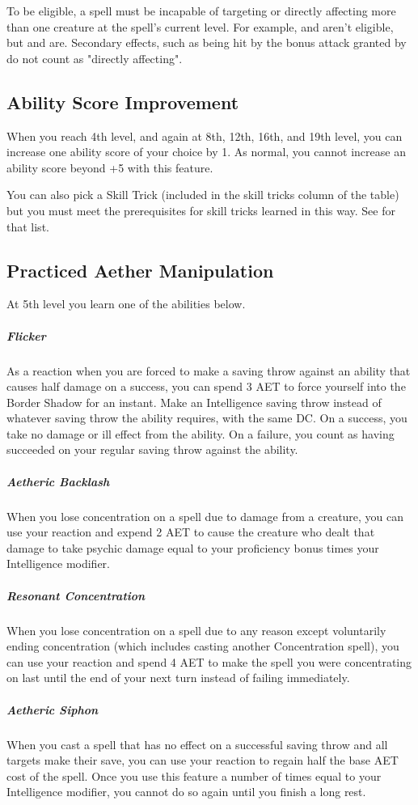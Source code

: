 To be eligible, a spell must be incapable of targeting or directly affecting more than one creature at the spell's current level. For example,  and  aren't eligible, but  and  are. Secondary effects, such as being hit by the bonus attack granted by  do not count as "directly affecting".

\subsection{Ability Score Improvement}

When you reach 4th level, and again at 8th, 12th, 16th, and 19th level, you can increase one ability score of your choice by 1. As normal, you cannot increase an ability score beyond +5 with this feature.

You can also pick a Skill Trick (included in the skill tricks column of the  table) but you must meet the prerequisites for skill tricks learned in this way. See  for that list.

\subsection{Practiced Aether Manipulation}
At 5th level you learn one of the abilities below.
\subparagraph*{Flicker} As a reaction when you are forced to make a saving throw against an ability that causes half damage on a success, you can spend 3 AET to force yourself into the Border Shadow for an instant. Make an Intelligence saving throw instead of whatever saving throw the ability requires, with the same DC. On a success, you take no damage or ill effect from the ability. On a failure, you count as having succeeded on your regular saving throw against the ability.
\subparagraph*{Aetheric Backlash} When you lose concentration on a spell due to damage from a creature, you can use your reaction and expend 2 AET to cause the creature who dealt that damage to take psychic damage equal to your proficiency bonus times your Intelligence modifier.
\subparagraph*{Resonant Concentration} When you lose concentration on a spell due to any reason except voluntarily ending concentration (which includes casting another Concentration spell), you can use your reaction and spend 4 AET to make the spell you were concentrating on last until the end of your next turn instead of failing immediately.
\subparagraph*{Aetheric Siphon} When you cast a spell that has no effect on a successful saving throw and all targets make their save, you can use your reaction to regain half the base AET cost of the spell. Once you use this feature a number of times equal to your Intelligence modifier, you cannot do so again until you finish a long rest.


